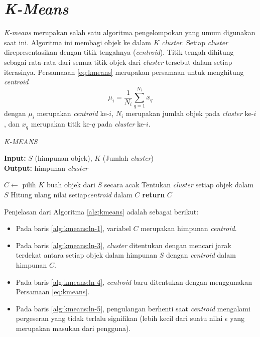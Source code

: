 \section{\textit{K-Means}}
\textit{K-means} merupakan salah satu algoritma pengelompokan yang umum digunakan saat ini. Algoritma ini membagi objek ke dalam $K$ \textit{cluster}. Setiap \textit{cluster} direpresentasikan dengan titik tengahnya (\textit{centroid}). Titik tengah dihitung sebagai rata-rata dari semua titik objek dari \textit{cluster} tersebut dalam setiap iterasinya. Persamaaan \ref{eq:kmeans} merupakan persamaan untuk menghitung \textit{centroid}
\begin{equation}
	\label{eq:kmeans}
	\mu_i=\frac{1}{N_i}\sum_{q=1}^{N_i}x_q
\end{equation}
dengan $\mu_i$ merupakan \textit{centroid} ke-$i$, $N_i$ merupakan jumlah objek pada \textit{cluster} ke-$i$, dan $x_q$ merupakan titik ke-$q$ pada \textit{cluster} ke-$i$.

\begin{algorithm} %
\caption{\textit{K-MEANS}} %
\label{alg:kmeans} %
\begin{flushleft}
	\textbf{Input:} $S$ (himpunan objek), $K$ (Jumlah \textit{cluster})\\
	\textbf{Output:} himpunan \textit{cluster}
\end{flushleft}
\begin{algorithmic}[1] %
	\STATE $C \leftarrow $ pilih $K$ buah objek dari $S$ secara acak \label{alg:kmeans:ln-1}
	\REPEAT \label{alg:kmeans:ln-2}
		\STATE Tentukan \textit{cluster} setiap objek dalam $S$ \label{alg:kmeans:ln-3}
		\STATE Hitung ulang nilai setiap\textit{centroid} dalam $C$ \label{alg:kmeans:ln-4}
	 \label{alg:kmeans:ln-5}
	\STATE \textbf{return} $C$
\end{algorithmic} 
\end{algorithm}

Penjelasan dari Algoritma \ref{alg:kmeans} adalah sebagai berikut:
\begin{itemize}
	\item Pada baris \ref{alg:kmeans:ln-1}, variabel $C$ merupakan himpunan \textit{centroid}.
	\item Pada baris \ref{alg:kmeans:ln-3}, \textit{cluster} ditentukan dengan mencari jarak terdekat antara setiap objek dalam himpunan $S$ dengan \textit{centroid} dalam himpunan $C$.
	\item Pada baris \ref{alg:kmeans:ln-4}, \textit{centroid} baru ditentukan dengan menggunakan Persamaan \ref{eq:kmeans}.
	\item Pada baris \ref{alg:kmeans:ln-5}, pengulangan berhenti saat \textit{centroid} mengalami pergeseran yang tidak terlalu signifikan (lebih kecil dari suatu nilai $\epsilon$ yang merupakan masukan dari pengguna).
\end{itemize}

